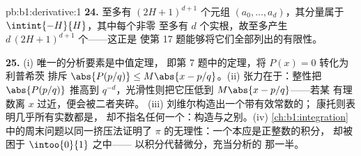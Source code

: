 \begin{solution}{pb:b1:derivative:1}
\textbf{24.} 至多有 $(2H+1)^{d+1}$ 个元组 $(a_0,
\dots, a_d)$，其分量属于 $\intint{-H}{H}$，其中每个非零
至多有 $d$ 个实根，故至多产生
$d\,(2H+1)^{d+1}$ 个——这正是
使第 17 题能够将它们全部列出的有限性。

\textbf{25.} (i) 唯一的分析要素是中值定理，
即第 7 题中的定理，将 $P(x) =
0$ 转化为 利普希茨 排斥 $\abs{P(p/q)} \leq M\abs{x -
p/q}$。(ii) 张力在于：整性把 $\abs{P(p/q)}$ 推高到
$q^{-d}$，光滑性则把它压低到 $M\abs{x - p/q}$——若某
有理数离 $x$ 过近，便会被二者夹碎。
(iii) 刘维尔构造出一个带有效常数的；
康托则表明几乎所有实数都是，
却不指名任何一个：构造与之别。(iv)
\cref{ch:b1:integration}中的周末问题以同一挤压法证明了
$\pi$ 的无理性：一个本应是正整数的积分，
却被困于 $\intoo{0}{1}$ 之中——
以积分代替微分，充当分析的
那一半。
\end{solution}
